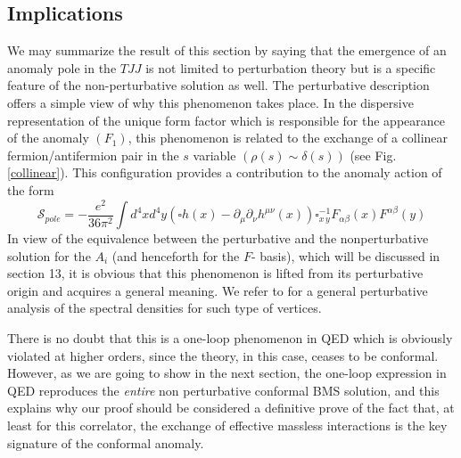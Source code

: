 \documentclass[a4paper,11pt,openright,twoside]{book}
\numberwithin{equation}{section}
\begin{document}
{{\subsection{Implications}
We may summarize the result of this section by saying that the emergence of an anomaly pole in the $TJJ$ is not limited to perturbation theory but is a specific feature of the non-perturbative solution as well. The perturbative description offers a simple view of why this phenomenon takes place. In the dispersive representation of the unique form factor which is responsible for the appearance of the anomaly $(F_1)$, this phenomenon is related to the exchange of a collinear fermion/antifermion pair in the $s$ variable $(\rho(s)\sim \delta(s))$ (see Fig. \ref{collinear}). This configuration provides a contribution to the anomaly action of the form 
\begin{equation}
	\label{pole}
	\mathcal{S}_{pole}= - \frac{e^2}{ 36 \pi^2}\int d^4 x d^4 y \left(\square h(x) - \partial_\mu\partial_\nu h^{\mu\nu}(x)\right)  \square^{-1}_{x\, y} F_{\alpha\beta}(x)F^{\alpha\beta}(y)
\end{equation}
In view of the equivalence between the perturbative and the nonperturbative solution for the $A_i$ (and henceforth for the $F$- basis), which will be discussed in section 13, it is obvious that this phenomenon is lifted from its perturbative origin and acquires a general meaning. We refer to \cite{Giannotti:2008cv,Coriano:2014gja} for a general perturbative analysis 
of the spectral densities for such type of vertices.

There is no doubt that this is a one-loop phenomenon in QED which is obviously violated at higher orders, since the theory, in this case, ceases to be conformal. However, as we are going to show in the next section, the one-loop expression in QED reproduces the {\em entire} non perturbative conformal BMS solution, and this explains why our proof should be considered a definitive prove of the fact that, at least for this correlator, the exchange of effective massless interactions is the key signature of the conformal anomaly. 

}}
\end{document}
